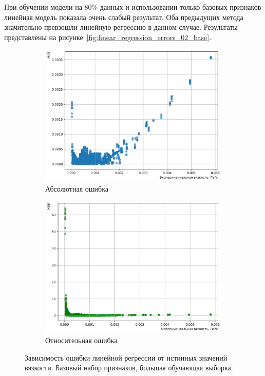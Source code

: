 \documentclass[a4paper,12pt]{article}
\begin{document}
    При обучении модели на 80\% данных и использовании только базовых признаков линейная модель показала очень слабый результат. Оба предыдущих метода значительно превзошли линейную регрессию в данном случае. Результаты представлены на рисунке~\autoref{fig:linear_regression_errors_02_base}.
    
    \begin{figure}[ht!]
      \centering
      \begin{subfigure}{0.48\textwidth}
          \centering
          \includegraphics[width=\linewidth]{linear_regression/MAE_Linear Model_0.2_base.png}
          \caption{Абсолютная ошибка}
      \end{subfigure}
      \hfill
      \begin{subfigure}{0.48\textwidth}
          \centering
          \includegraphics[width=\linewidth]{linear_regression/MRE_Linear Model_0.2_base.png}
          \caption{Относительная ошибка}
      \end{subfigure}
      \caption{Зависимость ошибки линейной регрессии от истинных значений вязкости. Базовый набор признаков, большая обучающая выборка.}
      \label{fig:linear_regression_errors_02_base}
    \end{figure}
    
\end{document}
